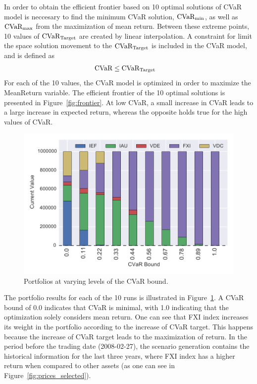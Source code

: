 In order to obtain the efficient frontier based on 10 optimal solutions of CVaR model is neccesary to find the minimum CVaR solution, $\textup{CVaR}_{\min}$, as well as $\textup{CVaR}_{\max}$ from the maximization of mean return.
Between these extreme points, 10 values of $\textup{CVaR}_{\textup{Target}}$ are created by linear interpolation. 
A constraint for limit the space solution movement to the $\textup{CVaR}_{\textup{Target}}$ is included in the CVaR model, and is defined as
\begin{align}
\textup{CVaR} &\le \textup{CVaR}_{\textup{Target}} 
\end{align}
For each of the 10 values, the CVaR model is optimized in order to maximize the MeanReturn variable. 
The efficient frontier of the 10 optimal solutions is presented in Figure~\ref{fig:frontier}.
At low CVaR, a small increase in CVaR leads to a large increase in expected return, whereas the opposite holds true for the high values of CVaR.


\begin{figure}[tp]
\centering
\includegraphics[width=1.0\textwidth]{../pic/Stake_vs_CVaR.pdf}
\caption{Portfolios at varying levels of the CVaR bound.}
\label{fig:scenarioportfolios}
\end{figure}

The portfolio results for each of the 10 runs is illustrated in Figure~\ref{fig:scenarioportfolios}.
A CVaR bound of 0.0 indicates that CVaR is minimal, with 1.0 indicating that the optimization solely considers mean return.
One can see that FXI index increases its weight in the portfolio according to the increase of CVaR target. 
This happens because the increase of CVaR target leads to the maximization of return.
In the period before the trading date (2008-02-27), the scenario generation contains the historical information for the last three years, where FXI index has a higher return when compared to other assets (as one can see in Figure~\ref{fig:prices_selected}).

